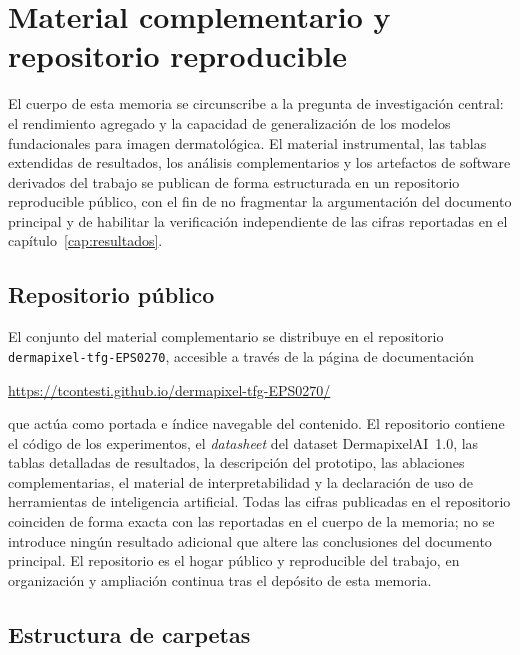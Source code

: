 
\chapter{Material complementario y repositorio reproducible}
\label{cap:repo}

El cuerpo de esta memoria se circunscribe a la pregunta de
investigación central: el rendimiento agregado y la capacidad de
generalización de los modelos fundacionales para imagen
dermatológica. El material instrumental, las tablas extendidas de
resultados, los análisis complementarios y los artefactos de
software derivados del trabajo se publican de forma estructurada en
un repositorio reproducible público, con el fin de no fragmentar la
argumentación del documento principal y de habilitar la
verificación independiente de las cifras reportadas en el
capítulo~\ref{cap:resultados}.

\section{Repositorio público}
\label{sec:repo-general}

El conjunto del material complementario se distribuye en el
repositorio \texttt{dermapixel-tfg-EPS0270}, accesible a través de
la página de documentación

\begin{center}
\url{https://tcontesti.github.io/dermapixel-tfg-EPS0270/}
\end{center}

\noindent que actúa como portada e índice navegable del contenido.
El repositorio contiene el código de los experimentos, el
\emph{datasheet} del dataset DermapixelAI~1.0, las tablas detalladas
de resultados, la descripción del prototipo, las ablaciones
complementarias, el material de interpretabilidad y la declaración
de uso de herramientas de inteligencia artificial. Todas las cifras
publicadas en el repositorio coinciden de forma exacta con las
reportadas en el cuerpo de la memoria; no se introduce ningún
resultado adicional que altere las conclusiones del documento
principal. El repositorio es el hogar público y reproducible del trabajo,
en organización y ampliación continua tras el depósito de esta memoria.

\section{Estructura de carpetas}
\label{sec:repo-estructura}

